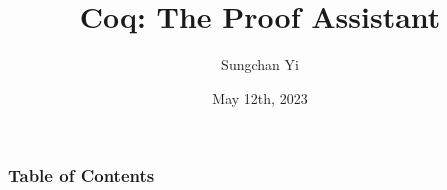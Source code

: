 \documentclass[aspectratio=169,handout]{beamer}
\title[Coq: The Proof Assistant]{\textbf{Coq: The Proof Assistant}}
\author{Sungchan Yi}
\institute{STEM SNU}
\date{May 12th, 2023}
\begin{document}
\frame{\titlepage}

\begin{frame}
  \frametitle{Table of Contents}
  \tableofcontents
\end{frame}



\frame{\titlepage}

%   
\end{document}

